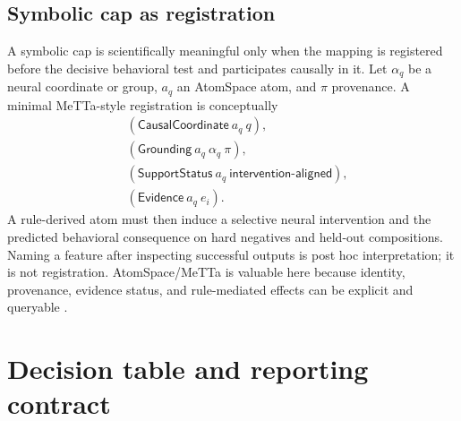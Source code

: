 \documentclass[11pt]{article}
\begin{document}
\subsection{Symbolic cap as registration}

A symbolic cap is scientifically meaningful only when the mapping is
registered before the decisive behavioral test and participates causally in
it.  Let $\alpha_q$ be a neural coordinate or group, $a_q$ an AtomSpace atom,
and $\pi$ provenance.  A minimal MeTTa-style registration is conceptually
\[
\begin{split}
 &(\textsf{CausalCoordinate}\ a_q\ q),\\
 &(\textsf{Grounding}\ a_q\ \alpha_q\ \pi),\\
 &(\textsf{SupportStatus}\ a_q\ \textsf{intervention-aligned}),\\
 &(\textsf{Evidence}\ a_q\ e_i).
\end{split}
\]
A rule-derived atom must then induce a selective neural intervention and the
predicted behavioral consequence on hard negatives and held-out compositions.
Naming a feature after inspecting successful outputs is post hoc
interpretation; it is not registration.  AtomSpace/MeTTa is valuable here
because identity, provenance, evidence status, and rule-mediated effects can
be explicit and queryable \cite{metta,hyperseed}.

\section{Decision table and reporting contract}
\end{document}
